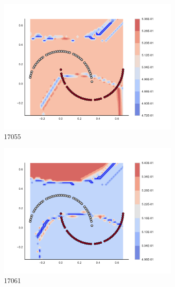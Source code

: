\begin{figure}[h]
\begin{subfigure}[b]{0.09\textwidth}
    \includegraphics[clip, trim=2.35cm 1.75cm 4.5cm 0cm,width=\textwidth]{img/convergence/17055.pdf}
    \caption{17055}
    \label{fig:convergence_17055}
\end{subfigure}
%
\begin{subfigure}[b]{0.09\textwidth}
    \includegraphics[clip, trim=2.35cm 1.75cm 4.5cm 0cm,width=\textwidth]{img/convergence/17061.pdf}
    \caption{17061}
    \label{fig:convergence_17061}
\end{subfigure}
%
\begin{subfigure}[b]{0.09\textwidth}

\end{subfigure}
\end{figure}
